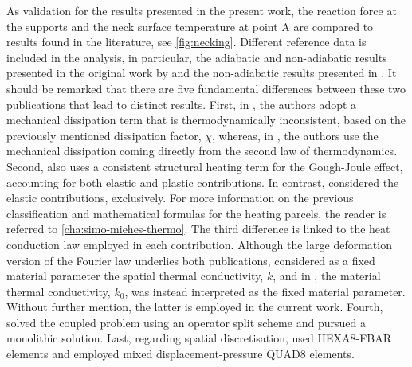 As validation for the results presented in the present work, the reaction force at the supports and the neck surface temperature at point A are compared to results found in the literature, see \ref{fig:necking}.
Different reference data is included in the analysis, in particular, the adiabatic and non-adiabatic results presented in the original work by \cite{simo_associative_1992} and the non-adiabatic results presented in \cite{danowski_computational_2014}.
It should be remarked that there are five fundamental differences between these two publications that lead to distinct results.
First, in \cite{simo_associative_1992}, the authors adopt a mechanical dissipation term that is thermodynamically inconsistent, based on the previously mentioned dissipation factor, $\chi$, whereas, in \cite{danowski_computational_2014}, the authors use the mechanical dissipation coming directly from the second law of thermodynamics.
Second, \cite{danowski_computational_2014} also uses a consistent structural heating term for the Gough-Joule effect, accounting for both elastic and plastic contributions.
In contrast, \cite{simo_associative_1992} considered the elastic contributions, exclusively.
For more information on the previous classification and mathematical formulas for the heating parcels, the reader is referred to \ref{cha:simo-miehes-thermo}.
The third difference is linked to the heat conduction law employed in each contribution.
Although the large deformation version of the Fourier law underlies both publications, \cite{simo_associative_1992} considered as a fixed material parameter the spatial thermal conductivity, $k$, and in \cite{danowski_computational_2014}, the material thermal conductivity, $k_{0}$, was instead interpreted as the fixed material parameter.
Without further mention, the latter is employed in the current work.
Fourth, \cite{simo_associative_1992} solved the coupled problem using an operator split scheme and \cite{danowski_computational_2014} pursued a monolithic solution.
Last, regarding  spatial discretisation, \cite{danowski_computational_2014} used HEXA8-FBAR elements and \cite{simo_associative_1992} employed mixed displacement-pressure QUAD8 elements.

